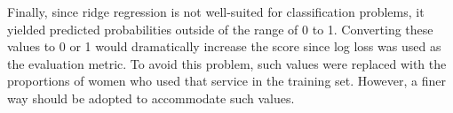 \documentclass{article}\usepackage[]{graphicx}\usepackage[]{color}
\begin{document}
                                                                                                                                                                                                                                                                                                                                                                                                                                                                                                                                                                                                Finally, since ridge regression is not well-suited for classification problems, it yielded predicted probabilities outside of the range of 0 to 1. Converting these values to 0 or 1 would dramatically increase the score since log loss was used as the evaluation metric. To avoid this problem, such values were replaced with the proportions of women who used that service in the training set. However, a finer way should be adopted to accommodate such values.
                                                                                                                                                                                                                                                                                                                                                                                                                                                                                                                                                                                                \clearpage
\end{document}
